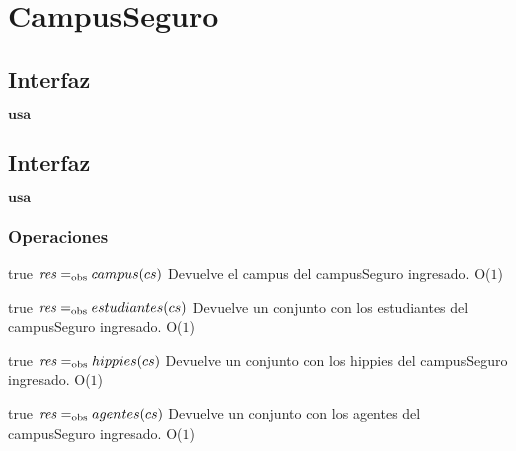 
\section{CampusSeguro}

\subsection{Interfaz}

$\textbf{usa}$  


\subsection{Interfaz}

$\textbf{usa}$  


\subsubsection*{Operaciones}



 {true}
 {$\text{\textit{res}} =_{\mathrm{obs}} campus(cs)$}
 {Devuelve el campus del campusSeguro ingresado.}
 {O($1$)}
 {}
 
 {true}
 {$\text{\textit{res}} =_{\mathrm{obs}} estudiantes(cs)$}
 {Devuelve un conjunto con los estudiantes del campusSeguro ingresado.}
 {O($1$)}
 {}
 
 {true}
 {$\text{\textit{res}} =_{\mathrm{obs}} hippies(cs)$}
 {Devuelve un conjunto con los hippies del campusSeguro ingresado.}
 {O($1$)}
 {}

 {true}
 {$\text{\textit{res}} =_{\mathrm{obs}} agentes(cs)$}
 {Devuelve un conjunto con los agentes del campusSeguro ingresado.}
 {O($1$)}
 {}
 
